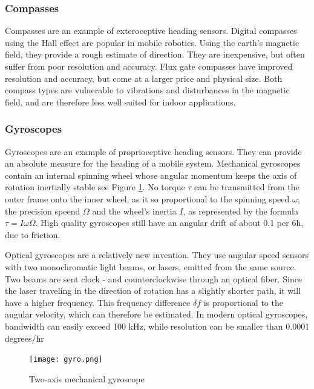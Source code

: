 \subsubsection{Compasses}
Compasses are an example of exteroceptive heading sensors. Digital compasses using the Hall effect are popular in mobile robotics. Using the earth's magnetic field, they provide a rough estimate of direction. They are inexpensive, but often suffer from poor resolution and accuracy. Flux gate compasses have improved resolution and accuracy, but come at a larger price and physical size. Both compass types are vulnerable to vibrations and disturbances in the magnetic field, and are therefore less well suited for indoor applications.

\subsubsection{Gyroscopes}
Gyroscopes are an example of proprioceptive heading sensors. They can provide an absolute measure for the heading of a mobile system. Mechanical gyroscopes contain an internal spinning wheel whose angular momentum keeps the axis of rotation inertially stable see Figure \ref{fig:gyro}. No torque $\tau$ can be transmitted from the outer frame onto the inner wheel, as it so proportional to the spinning speed $\omega$, the precision speend $\Omega$ and the wheel's inertia $I$, as represented by the formula $\tau = I\omega\Omega$. High quality gyroscopes still have an angular drift of about 0.1 per 6h, due to friction.

Optical gyroscopes are a relatively new invention. They use angular speed sensors with two monochromatic light beams, or lasers, emitted from the same source. Two beams are sent clock - and counterclockwise through an optical fiber. Since the laser traveling in the direction of rotation has a slightly shorter path, it will have a higher frequency. This frequency difference $\delta f$ is proportional to the angular velocity, which can therefore be estimated. In modern optical gyroscopes, bandwidth can easily exceed 100 kHz, while resolution can be smaller than 0.0001 degrees/hr



\begin{figure}[H]
\centering
        \texttt{[image: gyro.png]}
        \caption{Two-axis mechanical gyroscope \cite{SNS}}
        \label{fig:gyro}
\end{figure}





